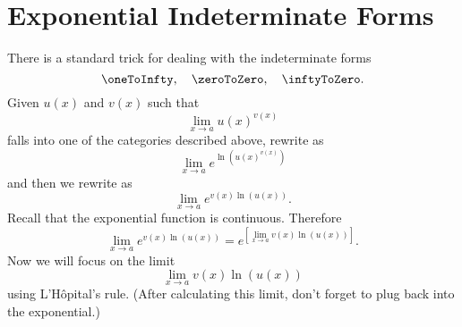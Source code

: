 \documentclass{ximera}
\begin{document}
\section{Exponential Indeterminate Forms}

There is a standard trick for dealing with the indeterminate forms
\[
\oneToInfty,\quad \zeroToZero,\quad \inftyToZero.
\]
Given $u(x)$ and $v(x)$ such that
\[
\lim_{x\to a}u(x)^{v(x)}
\]
falls into one of the categories described above, rewrite as
\[
    \lim_{x\to a}e^{\ln\left(u(x)^{v(x)}\right)}
\]
and then we rewrite as
\[
    \lim_{x\to a}e^{v(x)\ln{(u(x))}}.
\]
 Recall that the exponential function is continuous. Therefore
\[
 \lim_{x\to a}e^{v(x)\ln{(u(x))}}=e^{\left[\lim_{x\to a} v(x)\ln(u(x))\right]}. 
\]
Now we will focus on the limit
\[
\lim_{x\to a} v(x)\ln(u(x))
\]
using L'H\^{o}pital's rule. (After calculating this limit, don't forget to plug back into the exponential.)
\end{document}
